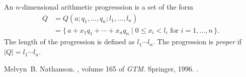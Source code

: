 \documentclass[12pt]{article}
\begin{document}
An $n$-dimensional arithmetic progresssion is a set of the form
\begin{align*}
Q&=Q(a; q_1, \dotsc, q_n; l_1, \dotsc, l_n)\\
 &=\{\,a+x_1 q_1+\dotsb+x_n q_n \mid 0\leq x_i<l_i\text{ for } i=1,\dotsc,n \,\}.
\end{align*}
The length of the progression is defined as $l_1\dotsb l_n$. The progression is \emph{proper} if $|Q|=l_1\dotsb l_n$.

\begin{thebibliography}{1}

Melvyn~B. Nathanson.
, volume 165 of {\em GTM}.
\newblock Springer, 1996.
\newblock {}.

\end{thebibliography}
\end{document}
